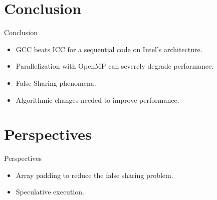 \documentclass{beamer}
\begin{document}
\section{Conclusion}

\begin{frame}{Conclusion}
\begin{itemize}
	\item
	GCC beats ICC for a sequential code on Intel's architecture.
	\item
	Parallelization with OpenMP can severely degrade performance.
  \item
    False Sharing phenomena.
  \item
  	Algorithmic changes needed to improve performance.
 \end{itemize}	
\end{frame}

\section{Perspectives}

\begin{frame}{Perspectives}
\begin{itemize}
	\item
	Array padding to reduce the false sharing problem.
	\item
	Speculative execution.
 \end{itemize}	
\end{frame}
\end{document}
